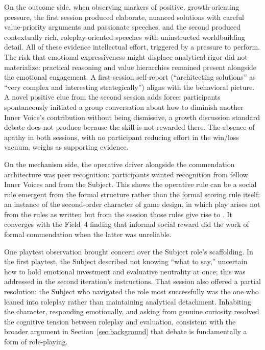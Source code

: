 On the outcome side, when observing markers of positive, growth-orienting pressure, the first session produced elaborate, nuanced solutions with careful value-priority arguments and passionate speeches, and the second produced contextually rich, roleplay-oriented speeches with uninstructed worldbuilding detail. All of these evidence intellectual effort, triggered by a pressure to perform. The risk that emotional expressiveness might displace analytical rigor did not materialize: practical reasoning and value hierarchies remained present alongside the emotional engagement. A first-session self-report (``architecting solutions'' as ``very complex and interesting strategically'') aligns with the behavioral picture. A novel positive clue from the second session adds force: participants spontaneously initiated a group conversation about how to diminish another Inner Voice's contribution without being dismissive, a growth discussion standard debate does not produce because the skill is not rewarded there. The absence of apathy in both sessions, with no participant reducing effort in the win/loss vacuum, weighs as supporting evidence.

On the mechanism side, the operative driver alongside the commendation architecture was peer recognition: participants wanted recognition from fellow Inner Voices and from the Subject. This shows the operative rule can be a social rule emergent from the formal structure rather than the formal scoring rule itself: an instance of the second-order character of game design, in which play arises not from the rules as written but from the session those rules give rise to \parencite{salen2004rules}. It converges with the Field~4 finding that informal social reward did the work of formal commendation when the latter was unreliable.

One playtest observation brought concern over the Subject role's scaffolding. In the first playtest, the Subject described not knowing ``what to say,'' uncertain how to hold emotional investment and evaluative neutrality at once; this was addressed in the second iteration's instructions. That session also offered a partial resolution: the Subject who navigated the role most successfully was the one who leaned into roleplay rather than maintaining analytical detachment. Inhabiting the character, responding emotionally, and asking from genuine curiosity resolved the cognitive tension between roleplay and evaluation, consistent with the broader argument in Section~\ref{sec:background} that debate is fundamentally a form of role-playing.

